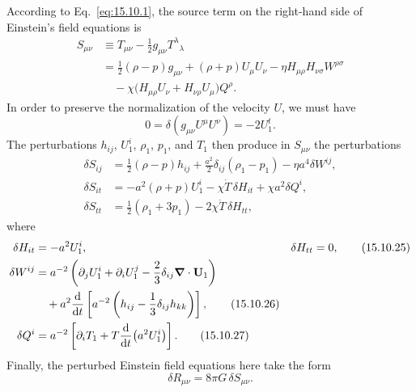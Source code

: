 According to Eq.~\eqref{eq:15.10.1}, the source term on the right-hand side
of Einstein's field equations is
\begin{equation}
  \begin{split}
  S_{\mu\nu}
  &\equiv
  T_{\mu\nu}-\frac12g_{\mu\nu}T^\lambda{}_\lambda\\
  &=
  \frac12(\rho-p)g_{\mu\nu}
  +(\rho+p)U_\mu U_\nu
  -\eta H_{\mu\rho}H_{\nu\sigma}W^{\rho\sigma}\\
  &\quad
  -\chi\bigl(H_{\mu\rho}U_\nu+H_{\nu\rho}U_\mu\bigr)Q^\rho.
  \end{split}
  \tag{15.10.21}\label{eq:15.10.21}
\end{equation}
In order to preserve the normalization of the velocity \(U\), we must have
\[
  0=\delta(g_{\mu\nu}U^\mu U^\nu)=-2U_1^t.
\]
The perturbations \(h_{ij}\), \(U_1^i\), \(\rho_1\), \(p_1\), and \(T_1\)
then produce in \(S_{\mu\nu}\) the perturbations
\begin{align}
  \delta S_{ij}
  &=
  \frac12(\rho-p)h_{ij}
  +\frac{a^2}{2}\delta_{ij}(\rho_1-p_1)
  -\eta a^4\delta W^{ij},
  \tag{15.10.22}\label{eq:15.10.22}\\
  \delta S_{it}
  &=
  -a^2(\rho+p)U_1^i
  -\chi\dot T\,\delta H_{it}
  +\chi a^2\delta Q^i,
  \tag{15.10.23}\label{eq:15.10.23}\\
  \delta S_{tt}
  &=
  \frac12(\rho_1+3p_1)-2\chi\dot T\,\delta H_{tt},
  \tag{15.10.24}\label{eq:15.10.24}
\end{align}
where
\begin{align}
  \delta H_{it}
  &=-a^2U_1^i,
  &\delta H_{tt}&=0,
  \tag{15.10.25}\label{eq:15.10.25}\\
  \delta W^{ij}
  &=
  a^{-2}
  \left(
    \partial_jU_1^i+\partial_iU_1^j
    -\frac23\delta_{ij}\boldsymbol{\nabla}\cdot\mathbf U_1
  \right)
  \notag\\
  &\quad
  +a^2\frac{\mathop{}\!\mathrm{d}}{\mathop{}\!\mathrm{d} t}
  \left[
    a^{-2}
    \left(h_{ij}-\frac13\delta_{ij}h_{kk}\right)
  \right],
  \tag{15.10.26}\label{eq:15.10.26}\\
  \delta Q^i
  &=
  a^{-2}
  \left[
    \partial_iT_1
    +T\frac{\mathop{}\!\mathrm{d}}{\mathop{}\!\mathrm{d} t}\bigl(a^2U_1^i\bigr)
  \right].
  \tag{15.10.27}\label{eq:15.10.27}
\end{align}
Finally, the perturbed Einstein field equations here take the form
\begin{equation}
  \delta R_{\mu\nu}=8\pi G\,\delta S_{\mu\nu}.
  \tag{15.10.28}\label{eq:15.10.28}
\end{equation}
